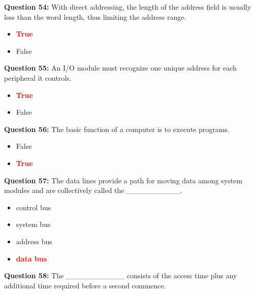 \documentclass[12pt,a4paper]{article}
\begin{document}
\vspace{0.5cm}

\textbf{Question 54:} With direct addressing, the length of the address field is usually less than the word length, thus limiting the address range.

\begin{itemize}
    \item[\textbf{A.}] \textcolor{red}{\textbf{True}}
    \item[\textbf{B.}] False
\end{itemize}

\vspace{0.5cm}

\textbf{Question 55:} An I/O module must recognize one unique address for each peripheral it controls.

\begin{itemize}
    \item[\textbf{A.}] \textcolor{red}{\textbf{True}}
    \item[\textbf{B.}] False
\end{itemize}

\vspace{0.5cm}

\textbf{Question 56:} The basic function of a computer is to execute programs.

\begin{itemize}
    \item[\textbf{A.}] False
    \item[\textbf{B.}] \textcolor{red}{\textbf{True}}
\end{itemize}

\vspace{0.5cm}

\textbf{Question 57:} The data lines provide a path for moving data among system modules and are collectively called the __________.

\begin{itemize}
    \item[\textbf{A.}] control bus
    \item[\textbf{B.}] system bus
    \item[\textbf{C.}] address bus
    \item[\textbf{D.}] \textcolor{red}{\textbf{data bus}}
\end{itemize}

\vspace{0.5cm}

\textbf{Question 58:} The ___________ consists of the access time plus any additional time required before a second commence.
\end{document}
